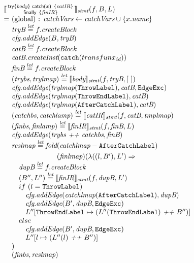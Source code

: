 \[\begin{array}{l@{}l@{~}l}
\lefteqn{\transfun{\irtryfull{\emph{body}}{x}{\emph{catIR}}{\emph{finIR}}}_{\emph{stmt}}(f, B, L)}\\
& = & \text{(global) : } \emph{catchVars} \leftarrow \emph{catchVars} \cup \{ x.\emph{name} \}\\
& & \emph{tryB} \letval f.\emph{createBlock}\\
& & \emph{cfg}.\emph{addEdge}(B, \emph{tryB})\\
& & \emph{catB} \letval f.\emph{createBlock}\\
& & \emph{catB}.\emph{createInst}(\TT{catch}(transfun{x}_{\emph{id}}))\\
& & \emph{finB} \letval f.\emph{createBlock}\\
& & (\emph{trybs}, \emph{trylmap}) \letval \transfun{\emph{body}}_{\emph{stmt}}(f, \emph{tryB}, [\ ])\\
& & \emph{cfg}.\emph{addEdge}(\emph{trylmap}(\ThrowLabel), \emph{catB}, \EdgeExc)\\
& & \emph{cfg}.\emph{addEdge}(\emph{trylmap}(\ThrowEndLabel), \emph{catB})\\
& & \emph{cfg}.\emph{addEdge}(\emph{trylmap}(\AfterCatchLabel), \emph{catB})\\
& & (\emph{catchbs}, \emph{catchlamp}) \letval \transfun{\emph{catIR}}_{\emph{stmt}}(f, \emph{catB}, \emph{tmplmap})\\
& & (\emph{finbs}, \emph{finlamp}) \letval \transfun{\emph{finIR}}_{\emph{stmt}}(f, \emph{finB}, L)\\
& & \emph{cfg}.\emph{addEdge}(\emph{trybs} ~\emph{++}~ \emph{catchbs}, \emph{finB})\\
& & \emph{reslmap} \letval \fold(\emph{catchlmap} - \AfterCatchLabel)\\
& & \phantom{\emph{reslmap} \letval \fold}(\emph{finlmap})
(\lambda((l, B'), L') \Rightarrow \\
& & \quad \emph{dupB} \letval f.\emph{createBlock}\\
& & \quad (B'', L'') \letval \transfun{\emph{finIR}}_{\emph{stmt}}(f, \emph{dupB}, L')\\
& & \quad if\ (l = \ThrowLabel)\\
& & \quad \phantom{if} \emph{cfg}.\emph{addEdge}(\emph{catchlmap}(\AfterCatchLabel), \emph{dupB})\\
& & \quad \phantom{if} \emph{cfg}.\emph{addEdge}(B', \emph{dupB}, \EdgeExc)\\
& & \quad \phantom{if} L''[\ThrowEndLabel \mapsto (L''(\ThrowEndLabel) ~\emph{++}~ B'')]\\
& & \quad else\\
& & \quad \phantom{if} \emph{cfg}.\emph{addEdge}(B', \emph{dupB}, \EdgeExc)\\
& & \quad \phantom{if} L''[l \mapsto (L''(l) ~\emph{++}~ B'')]\\
& & )\\
& & (\emph{finbs}, \emph{reslmap})\\
& & \\


\end{array}\]
